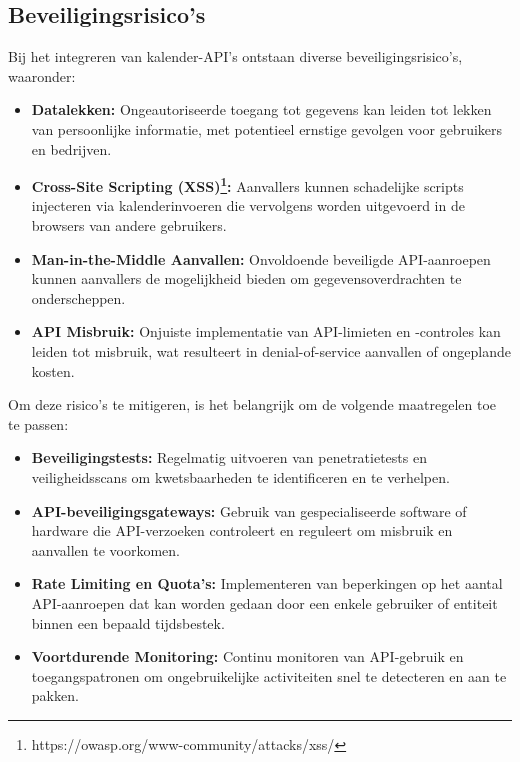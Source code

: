 \subsection{Beveiligingsrisico's}

Bij het integreren van kalender-API's ontstaan diverse beveiligingsrisico's, waaronder:

\begin{itemize}
    \item \textbf{Datalekken:} Ongeautoriseerde toegang tot gegevens kan leiden tot lekken van persoonlijke informatie, met potentieel ernstige gevolgen voor gebruikers en bedrijven.
    \item \textbf{Cross-Site Scripting (XSS)\footnote{https://owasp.org/www-community/attacks/xss/}:} Aanvallers kunnen schadelijke scripts injecteren via kalenderinvoeren die vervolgens worden uitgevoerd in de browsers van andere gebruikers.
    \item \textbf{Man-in-the-Middle Aanvallen:} Onvoldoende beveiligde API-aanroepen kunnen aanvallers de mogelijkheid bieden om gegevensoverdrachten te onderscheppen.
    \item \textbf{API Misbruik:} Onjuiste implementatie van API-limieten en -controles kan leiden tot misbruik, wat resulteert in denial-of-service aanvallen of ongeplande kosten.
\end{itemize}

Om deze risico's te mitigeren, is het belangrijk om de volgende maatregelen toe te passen:

\begin{itemize}
    \item \textbf{Beveiligingstests:} Regelmatig uitvoeren van penetratietests en veiligheidsscans om kwetsbaarheden te identificeren en te verhelpen.
    \item \textbf{API-beveiligingsgateways:} Gebruik van gespecialiseerde software of hardware die API-verzoeken controleert en reguleert om misbruik en aanvallen te voorkomen.
    \item \textbf{Rate Limiting en Quota's:} Implementeren van beperkingen op het aantal API-aanroepen dat kan worden gedaan door een enkele gebruiker of entiteit binnen een bepaald tijdsbestek.
    \item \textbf{Voortdurende Monitoring:} Continu monitoren van API-gebruik en toegangspatronen om ongebruikelijke activiteiten snel te detecteren en aan te pakken.
\end{itemize}
